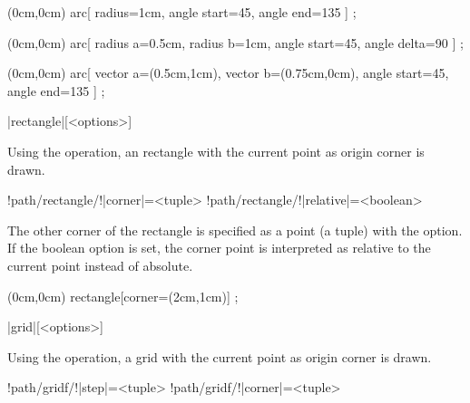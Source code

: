 \documentclass[a4paper]{article}
\begin{document}
{{\begin{codeexamplecolumns}
\begin{qdraw}
  \path[stroke] (0cm,0cm)
    arc[
      radius={1cm},
      angle start={45},
      angle end={135}
    ] ;
\end{qdraw}
\end{codeexamplecolumns}

\begin{codeexamplecolumns}
\begin{qdraw}
  \path[stroke] (0cm,0cm)
    arc[
      radius a={0.5cm},
      radius b={1cm},
      angle start={45},
      angle delta={90}
    ] ;
\end{qdraw}
\end{codeexamplecolumns}

\begin{codeexamplecolumns}
\begin{qdraw}
  \path[stroke] (0cm,0cm)
    arc[
      vector a={(0.5cm,1cm)},
      vector b={(0.75cm,0cm)},
      angle start={45},
      angle end={135}
    ] ;
\end{qdraw}
\end{codeexamplecolumns}

\begin{macrodef}
|rectangle|[<options>]
\end{macrodef}
Using the  operation, an rectangle with the current point as origin corner is drawn.

\begin{macrodef}
!path/rectangle/!|corner|={<tuple>}
!path/rectangle/!|relative|={<boolean>}
\end{macrodef}
The other corner of the rectangle is specified as a point (a tuple) with the  option. If the boolean option  is set, the corner point is interpreted as relative to the current point instead of absolute.

\begin{codeexamplecolumns}
\begin{qdraw}
  \path[stroke] (0cm,0cm)
    rectangle[corner={(2cm,1cm)}] ;
\end{qdraw}
\end{codeexamplecolumns}

\begin{macrodef}
|grid|[<options>]
\end{macrodef}
Using the  operation, a grid with the current point as origin corner is drawn.

\begin{macrodef}
!path/gridf/!|step|={<tuple>}
!path/gridf/!|corner|={<tuple>}
\end{macrodef}

}}
\end{document}
